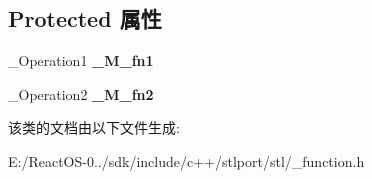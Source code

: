 \subsection*{Protected 属性}
\begin{DoxyCompactItemize}
\item 
\mbox{\label{classunary__compose_a7b6fea9a22b6e57f53c97280f2d051c5}} 
\+\_\+\+Operation1 {\bfseries \+\_\+\+M\+\_\+fn1}
\item 
\mbox{\label{classunary__compose_a5075dd598bfcf676cf6dd269835d727a}} 
\+\_\+\+Operation2 {\bfseries \+\_\+\+M\+\_\+fn2}
\end{DoxyCompactItemize}


该类的文档由以下文件生成\+:\begin{DoxyCompactItemize}
\item 
E\+:/\+React\+O\+S-\/0../sdk/include/c++/stlport/stl/\+\_\+function.\+h\end{DoxyCompactItemize}

